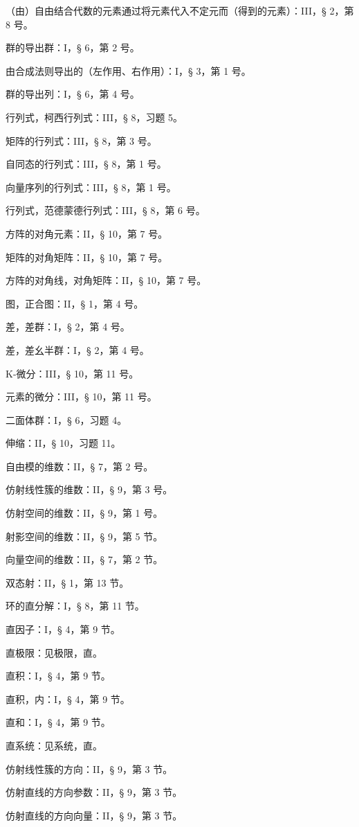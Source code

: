 （由）自由结合代数的元素通过将元素代入不定元而（得到的元素）：III，§ 2，第 8 号。

群的导出群：I，§ 6，第 2 号。

由合成法则导出的（左作用、右作用）：I，§ 3，第 1 号。

群的导出列：I，§ 6，第 4 号。

行列式，柯西行列式：III，§ 8，习题 5。

矩阵的行列式：III，§ 8，第 3 号。

自同态的行列式：III，§ 8，第 1 号。

向量序列的行列式：III，§ 8，第 1 号。

行列式，范德蒙德行列式：III，§ 8，第 6 号。

方阵的对角元素：II，§ 10，第 7 号。

矩阵的对角矩阵：II，§ 10，第 7 号。

方阵的对角线，对角矩阵：II，§ 10，第 7 号。

图，正合图：II，§ 1，第 4 号。

差，差群：I，§ 2，第 4 号。

差，差幺半群：I，§ 2，第 4 号。

K-微分：III，§ 10，第 11 号。

元素的微分：III，§ 10，第 11 号。

二面体群：I，§ 6，习题 4。

伸缩：II，§ 10，习题 11。

自由模的维数：II，§ 7，第 2 号。

仿射线性簇的维数：II，§ 9，第 3 号。

仿射空间的维数：II，§ 9，第 1 号。

射影空间的维数：II，§ 9，第 5 节。

向量空间的维数：II，§ 7，第 2 节。

双态射：II，§ 1，第 13 节。

环的直分解：I，§ 8，第 11 节。

直因子：I，§ 4，第 9 节。

直极限：见极限，直。

直积：I，§ 4，第 9 节。

直积，内：I，§ 4，第 9 节。

直和：I，§ 4，第 9 节。

直系统：见系统，直。

仿射线性簇的方向：II，§ 9，第 3 节。

仿射直线的方向参数：II，§ 9，第 3 节。

仿射直线的方向向量：II，§ 9，第 3 节。

